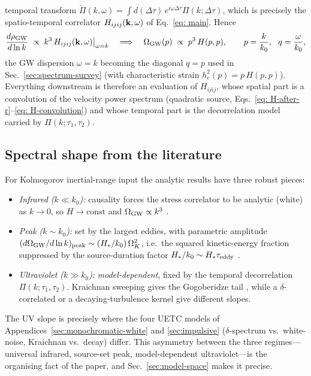 \documentclass[10pt,prd,aps,nobibnotes,superscriptaddress,preprintnumbers,notitlepage]{revtex4-1}
\newcommand{\kb}{{\bf k}}
\begin{document}
temporal transform $\widetilde\Pi(k,\omega)=\int d(\Delta\tau)\,e^{i\omega\Delta\tau}\Pi(k;\Delta\tau)$,
which is precisely the spatio-temporal correlator $H_{ijij}(\kb,\omega)$ of
Eq.~\eqref{eq: main}. Hence
\begin{equation}
  \frac{d\rho_{\rm GW}}{d\ln k} \;\propto\; k^3\,H_{ijij}(\kb,\omega)\big|_{\omega=k}
  \quad\Longrightarrow\quad
  \Omega_{\rm GW}(p)\;\propto\; p^3\,H(p,p),
  \qquad p=\frac{k}{k_0},\ \ q=\frac{\omega}{k_0},
  \label{eq:omega-diag}
\end{equation}
the GW dispersion $\omega=k$ becoming the diagonal $q=p$ used in
Sec.~\ref{sec:spectrum-survey} (with characteristic strain
$h_c^2(p)=p\,H(p,p)$). Everything downstream is therefore an evaluation of
$H_{ijij}$, whose spatial part is a convolution of the velocity power spectrum
(quadratic source, Eqs.~\eqref{eq: H-after-r}--\eqref{eq: H-convolution}) and
whose temporal part is the decorrelation model carried by $\Pi(k;\tau_1,\tau_2)$.

\subsection{Spectral shape from the literature}
\label{sec:framework-shape}

For Kolmogorov inertial-range input the analytic results have three robust
pieces:
\begin{itemize}
  \item \emph{Infrared ($k\ll k_0$):} causality forces the stress correlator to
  be analytic (white) as $k\to0$, so $H\to\text{const}$ and
  $\Omega_{\rm GW}\propto k^3$ \cite{Caprini:2018mtu,Kahniashvili:2008pe}.
  \item \emph{Peak ($k\sim k_0$):} set by the largest eddies, with parametric
  amplitude $(d\Omega_{\rm GW}/d\ln k)_{\rm peak}\sim (H_\ast/k_0)\,\Omega_K^2$,
  i.e.\ the squared kinetic-energy fraction suppressed by the source-duration
  factor $H_\ast/k_0\sim H_\ast\tau_{\rm eddy}$ \cite{Kosowsky:2001xp,Kahniashvili:2008pe}.
  \item \emph{Ultraviolet ($k\gg k_0$):} \emph{model-dependent}, fixed by the
  temporal decorrelation $\Pi(k;\tau_1,\tau_2)$. Kraichnan sweeping gives the
  Gogoberidze tail \cite{Gogoberidze:2007an}, while a $\delta$-correlated or a
  decaying-turbulence kernel give different slopes.
\end{itemize}
The UV slope is precisely where the four UETC models of
Appendices~\ref{sec:monochromatic-white} and \ref{sec:impulsive}
($\delta$-spectrum vs.\ white-noise, Kraichnan vs.\ decay) differ. This asymmetry
between the three regimes---universal infrared, source-set peak, model-dependent
ultraviolet---is the organising fact of the paper, and
Sec.~\ref{sec:model-space} makes it precise.
\end{document}
